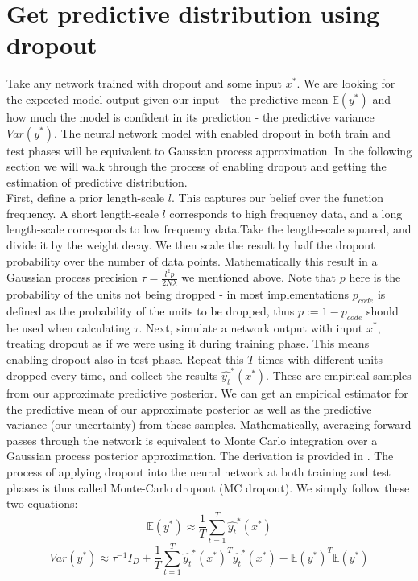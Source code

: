 \section{Get predictive distribution using dropout}

Take any network trained with dropout and some input $x^*$. We are looking for the expected model output given our input - the predictive mean $\mathbb{E}(y^*)$ and how much the model is confident in its prediction - the predictive variance $Var(y^*)$. The neural network model with enabled dropout in both train and test phases will be equivalent to Gaussian process approximation. In the following section we will walk through the process of enabling dropout and getting the estimation of predictive distribution.\\
First, define a prior length-scale $l$. This captures our belief over the function frequency. A short length-scale $l$ corresponds to high frequency data, and a long length-scale corresponds to low frequency data.Take the length-scale squared, and divide it by the weight decay. We then scale the result by half the dropout probability over the number of data points. Mathematically this result in a Gaussian process precision $\tau = \frac{l^2 p}{2N \lambda}$ we mentioned above. Note that $p$ here is the probability of the units not being dropped - in most implementations $p_{code}$ is defined as the probability of the units to be dropped, thus $p := 1- p_{code}$ should be used when calculating $\tau$. Next, simulate a network output with input $x^*$, treating dropout as if we were using it during training phase. This means enabling dropout also in test phase. Repeat this $T$ times with different units dropped every time, and collect the results ${\hat{y_t}^* (x^*)}$. These are empirical samples from our approximate predictive posterior. We can get an empirical estimator for the predictive mean of our approximate posterior as well as the predictive variance (our uncertainty) from these samples. Mathematically, averaging forward passes through the network is equivalent to Monte Carlo integration over a Gaussian process posterior approximation. The derivation is provided in \cite{gal2016dropout}. The process of applying dropout into the neural network at both training and test phases is thus called Monte-Carlo dropout (MC dropout). We simply follow these two equations:
\begin{equation}
    \mathbb{E} (y^*) \approx \frac{1}{T} \sum^{T}_{t=1} \hat{y_t}^*(x^*)
\end{equation}
\begin{equation}
    Var(y^*) \approx \tau^{-1} I_D + \frac{1}{T}\sum^{T}_{t=1} \hat{y_t}^*(x^*)^T \hat{y_t}^* (x^*) - \mathbb{E} (y^*)^T \mathbb{E} (y^*)
\end{equation}

